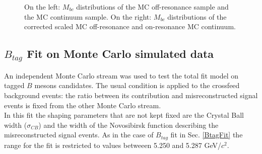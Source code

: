\begin{figure}[H]
\begin{minipage}{.5\textwidth}
\label{fig:bin_corrected_stream1_off-resonance_on_stream3_on-resonance}
\end{minipage}
\caption{On the left: $M_{bc}$ distributions of the MC off-resonance sample and the MC continuum sample. On the right: $M_{bc}$ distributions of the corrected scaled MC off-resonance and on-resonance MC continuum.}
\end{figure}


\subsection{$B_{tag}$ Fit on Monte Carlo simulated data}

An independent Monte Carlo stream was used to test the total fit model on tagged $B$ mesons candidates. 
The usual condition is applied to the crossfeed background events: the ratio between its contribution and misreconstructed signal events is fixed from the other Monte Carlo stream.\\
In this fit the shaping parameters that are not kept fixed are the Crystal Ball width ($\sigma_{CB}$) and the width of the Novosibirsk function describing the misreconstructed signal events.
As in the case of $B_{tag}$ fit in Sec. \ref{BtagFit} the range for the fit is restricted to values betweeen 5.250 and 5.287 GeV/$c^2$.   






